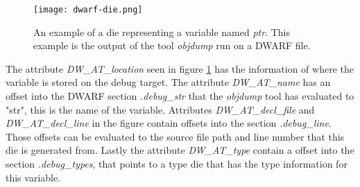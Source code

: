 \begin{figure}[h]
	\centering
	\texttt{[image: dwarf-die.png]}
	\caption{An example of a \gls{die} representing a variable named \emph{ptr}. This example is the output of the tool \emph{objdump} run on a \gls{DWARF} file.}
	\label{fig:dwarfdie}
\end{figure}


The attribute \emph{DW\_AT\_location} seen in figure \ref{fig:dwarfdie} has the information of where the variable is stored on the debug target.
The attribute \emph{DW\_AT\_name} has an offset into the \gls{DWARF} section \emph{.debug\_str} that the \emph{objdump} tool has evaluated to "str", this is the name of the variable.
Attributes \emph{DW\_AT\_decl\_file} and \emph{DW\_AT\_decl\_line} in the figure contain  offsets into the section \emph{.debug\_line}.
Those offsets can be evaluated to the source file path and line number that this \gls{die} is generated from.
Lastly the attribute \emph{DW\_AT\_type} contain a offset into the section \emph{.debug\_types}, that points to a type \gls{die} that has the type information for this variable.


